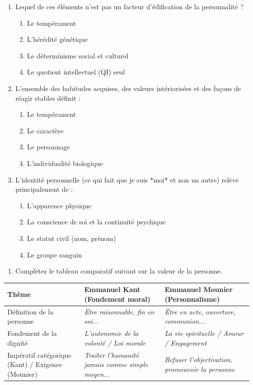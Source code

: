 \documentclass[11pt]{article}
\begin{document}
\begin{exercice}
\begin{enumerate}
    \item Lequel de ces éléments n'est pas un facteur d'édification de la personnalité ?
    \begin{enumerate}
        \item Le tempérament
        \item L'hérédité génétique
        \item Le déterminisme social et culturel
        \item Le quotient intellectuel (QI) seul
    \end{enumerate}
    \item L'ensemble des habitudes acquises, des valeurs intériorisées et des façons de réagir stables définit :
    \begin{enumerate}
        \item Le tempérament
        \item Le caractère
        \item Le personnage
        \item L'individualité biologique
    \end{enumerate}
    \item L'identité personnelle (ce qui fait que je suis *moi* et non un autre) relève principalement de :
    \begin{enumerate}
        \item L'apparence physique
        \item La conscience de soi et la continuité psychique
        \item Le statut civil (nom, prénom)
        \item Le groupe sanguin
    \end{enumerate}
\end{enumerate}
\end{exercice}

\begin{exercice}
\begin{enumerate}
    \item Complétez le tableau comparatif suivant sur la valeur de la personne.
\end{enumerate}
\begin{tabular}{|p{3.5cm}|p{6cm}|p{6cm}|}
\hline
\textbf{Thème} & \textbf{Emmanuel Kant (Fondement moral)} & \textbf{Emmanuel Mounier (Personnalisme)} \\
\hline
Définition de la personne & \textit{Être raisonnable, fin en soi...} & \textit{Être en acte, ouverture, communion...} \\
\hline
Fondement de la dignité & \textit{L'autonomie de la volonté / Loi morale} & \textit{La vie spirituelle / Amour / Engagement} \\
\hline
Impératif catégorique (Kant) / Exigence (Mounier) & \textit{Traiter l'humanité jamais comme simple moyen...} & \textit{Refuser l'objectivation, promouvoir la personne} \\
\hline
\end{tabular}
\end{exercice}
\end{document}
